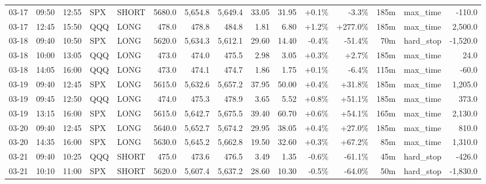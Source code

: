 \documentclass[11pt,a4paper,twoside]{article}
\begin{document}
\begin{landscape}
\begin{center}
\begin{longtable}{>{\color{txtmain}}l l l l l r r r r r r r r >{\color{txtmain}}l r}
03-17 & 09:50 & 12:55 & SPX & SHORT & 5680.0 & 5,654.8 & 5,649.4 & 33.05 & 31.95 & \textcolor{wingreen}{+0.1\%} & \textcolor{lossred}{-3.3\%} & 185m & max\_time & \textcolor{lossred}{-110.0} \\
03-17 & 12:45 & 15:50 & QQQ & LONG & 478.0 & 478.8 & 484.8 & 1.81 & 6.80 & \textcolor{wingreen}{+1.2\%} & \textcolor{wingreen}{+277.0\%} & 185m & max\_time & \textcolor{wingreen}{2,500.0} \\
03-18 & 09:40 & 10:50 & SPX & LONG & 5620.0 & 5,634.3 & 5,612.1 & 29.60 & 14.40 & \textcolor{lossred}{-0.4\%} & \textcolor{lossred}{-51.4\%} & 70m & hard\_stop & \textcolor{lossred}{-1,520.0} \\
03-18 & 10:00 & 13:05 & QQQ & LONG & 473.0 & 474.0 & 475.5 & 2.98 & 3.05 & \textcolor{wingreen}{+0.3\%} & \textcolor{wingreen}{+2.7\%} & 185m & max\_time & \textcolor{wingreen}{24.0} \\
03-18 & 14:05 & 16:00 & QQQ & LONG & 473.0 & 474.1 & 474.7 & 1.86 & 1.75 & \textcolor{wingreen}{+0.1\%} & \textcolor{lossred}{-6.4\%} & 115m & max\_time & \textcolor{lossred}{-60.0} \\
03-19 & 09:40 & 12:45 & SPX & LONG & 5615.0 & 5,632.6 & 5,657.2 & 37.95 & 50.00 & \textcolor{wingreen}{+0.4\%} & \textcolor{wingreen}{+31.8\%} & 185m & max\_time & \textcolor{wingreen}{1,205.0} \\
03-19 & 09:45 & 12:50 & QQQ & LONG & 474.0 & 475.3 & 478.9 & 3.65 & 5.52 & \textcolor{wingreen}{+0.8\%} & \textcolor{wingreen}{+51.1\%} & 185m & max\_time & \textcolor{wingreen}{373.0} \\
03-19 & 13:15 & 16:00 & SPX & LONG & 5615.0 & 5,642.7 & 5,675.5 & 39.40 & 60.70 & \textcolor{wingreen}{+0.6\%} & \textcolor{wingreen}{+54.1\%} & 165m & max\_time & \textcolor{wingreen}{2,130.0} \\
03-20 & 09:40 & 12:45 & SPX & LONG & 5640.0 & 5,652.7 & 5,674.2 & 29.95 & 38.05 & \textcolor{wingreen}{+0.4\%} & \textcolor{wingreen}{+27.0\%} & 185m & max\_time & \textcolor{wingreen}{810.0} \\
03-20 & 14:35 & 16:00 & SPX & LONG & 5630.0 & 5,645.2 & 5,662.8 & 19.50 & 32.60 & \textcolor{wingreen}{+0.3\%} & \textcolor{wingreen}{+67.2\%} & 85m & max\_time & \textcolor{wingreen}{1,310.0} \\
03-21 & 09:40 & 10:25 & QQQ & SHORT & 475.0 & 473.6 & 476.5 & 3.49 & 1.35 & \textcolor{lossred}{-0.6\%} & \textcolor{lossred}{-61.1\%} & 45m & hard\_stop & \textcolor{lossred}{-426.0} \\
03-21 & 10:10 & 11:00 & SPX & SHORT & 5620.0 & 5,607.4 & 5,637.2 & 28.60 & 10.30 & \textcolor{lossred}{-0.5\%} & \textcolor{lossred}{-64.0\%} & 50m & hard\_stop & \textcolor{lossred}{-1,830.0} \\

\end{longtable}
\end{center}
\end{landscape}
\end{document}

